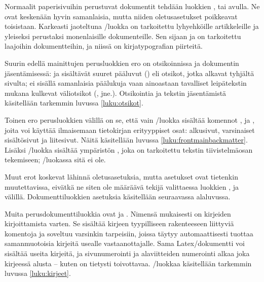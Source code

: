 Normaalit%
 paperisivuihin perustuvat
dokumentit tehdään luokkien ,  tai
 avulla. Ne ovat keskenään hyvin samanlaisia, mutta
niiden oletusasetukset poikkeavat toisistaan. Karkeasti jaoteltuna
\-/luokka on tarkoitettu lyhyehköille artikkeleille ja
yleiseksi perustaksi monenlaisille dokumenteille. Sen sijaan
 ja  on tarkoitettu laajoihin
dokumentteihin, ja niissä on kirja\-typo\-grafian piirteitä.

Suurin edellä mainittujen perusluokkien ero on otsikoinnissa ja
dokumentin jäsentämisessä:  ja 
sisältävät suuret pääluvut () eli otsikot, jotka
alkavat tyhjältä sivulta;  ei sisällä samanlaisia
päälukuja vaan ainoastaan tavalliset leipätekstin mukana kulkevat
väliotsikot (, 
jne.). Otsikointia ja tekstin jäsentämistä käsitellään tarkemmin luvussa
\ref{luku:otsikot}.

Toinen ero perusluokkien välillä on se, että vain \-/luokka
sisältää komennot ,  ja
, joita voi käyttää ilmaisemaan tietokirjan
erityyppiset osat: alkusivut, varsinaiset sisältösivut ja liitesivut.
Näitä käsitellään luvussa \ref{luku:frontmainbackmatter}. Lisäksi
\-/luokka sisältää ympäristön , joka on
tarkoitettu tekstin tiivis\-telmä\-osan tekemiseen;
\-/luokassa sitä ei ole.

Muut erot koskevat lähinnä oletusasetuksia, mutta asetukset ovat
tietenkin muutettavissa, eivätkä ne siten ole määräävä tekijä
valittaessa luokkien ,  ja
 välillä. Dokumenttiluokkien asetuksia käsitellään
seuraavassa alaluvussa.

Muita%
 perusdokumenttiluokkia ovat  ja
. Nimensä mukaisesti  on kirjeiden
kirjoittamista varten. Se sisältää kirjeen tyypilliseen rakenteeseen
liittyviä komentoja ja soveltuu varsinkin tarpeisiin, joissa täytyy
automaattisesti tuottaa samanmuotoisia kirjeitä usealle
vas\-taan\-otta\-jalle. Sama Latex\-/dokumentti voi sisältää useita
kirjeitä, ja sivunumerointi ja alaviitteiden numerointi alkaa joka
kirjeessä alusta -- kuten on tietysti toivottavaa.
\-/luokkaa käsitellään tarkemmin luvussa
\ref{luku:kirjeet}.

